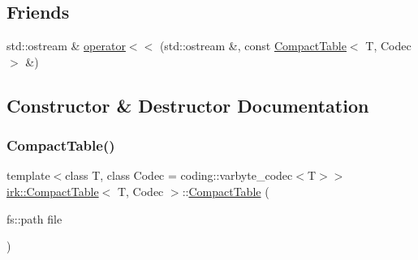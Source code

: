 \subsection*{Friends}
\begin{DoxyCompactItemize}
\item 
std\+::ostream \& \mbox{\hyperlink{classirk_1_1CompactTable_aca625eae690396584a3998222ddd856f}{operator$<$$<$}} (std\+::ostream \&, const \mbox{\hyperlink{classirk_1_1CompactTable}{Compact\+Table}}$<$ T, Codec $>$ \&)
\end{DoxyCompactItemize}


\subsection{Constructor \& Destructor Documentation}
\mbox{\label{classirk_1_1CompactTable_ae43cef6f30a5f83f0fbdbfec98adcc31}} 
\subsubsection{\texorpdfstring{Compact\+Table()}{CompactTable()}\hspace{0.1cm}{\footnotesize\ttfamily [1/2]}}
{\footnotesize\ttfamily template$<$class T, class Codec = coding\+::varbyte\+\_\+codec$<$\+T$>$$>$ \\
\mbox{\hyperlink{classirk_1_1CompactTable}{irk\+::\+Compact\+Table}}$<$ T, Codec $>$\+::\mbox{\hyperlink{classirk_1_1CompactTable}{Compact\+Table}} (\begin{DoxyParamCaption}\item[{fs\+::path}]{file }\end{DoxyParamCaption})\hspace{0.3cm}{\ttfamily [inline]}}

\mbox{\label{classirk_1_1CompactTable_a8dad958871c16f0d615d6dafcbcc2284}} 
